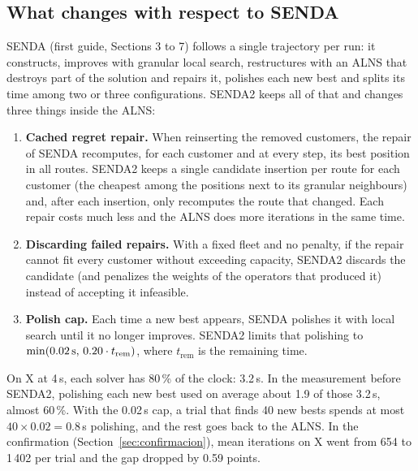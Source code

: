 \documentclass[11pt,a4paper]{article}
\newcommand{\senda}{SENDA}
\newcommand{\sendados}{SENDA2}
\begin{document}
\subsection{What changes with respect to \senda}

\senda{} (first guide, Sections 3 to 7) follows a single trajectory per run: it constructs, improves
with granular local search, restructures with an ALNS that destroys part of the solution and repairs
it, polishes each new best and splits its time among two or three configurations. \sendados{} keeps all
of that and changes three things inside the ALNS:

\begin{enumerate}[leftmargin=1.5em,label=(\alph*)]
\item \textbf{Cached regret repair.} When reinserting the removed customers, the repair of \senda{}
recomputes, for each customer and at every step, its best position in all routes. \sendados{} keeps a
single candidate insertion per route for each customer (the cheapest among the positions next to its
granular neighbours) and, after each insertion, only recomputes the route that changed. Each repair
costs much less and the ALNS does more iterations in the same time.
\item \textbf{Discarding failed repairs.} With a fixed fleet and no penalty, if the repair cannot fit
every customer without exceeding capacity, \sendados{} discards the candidate (and penalizes the
weights of the operators that produced it) instead of accepting it infeasible.
\item \textbf{Polish cap.} Each time a new best appears, \senda{} polishes it with local search until
it no longer improves. \sendados{} limits that polishing to $\min(0.02\text{\,s},\,0.20\cdot t_{\text{rem}})$,
where $t_{\text{rem}}$ is the remaining time.
\end{enumerate}

\begin{ejemplo}
On X at 4\,s, each solver has 80\,\% of the clock: 3.2\,s. In the measurement before \sendados, polishing
each new best used on average about 1.9 of those 3.2\,s, almost 60\,\%. With the 0.02\,s cap, a trial that
finds 40 new bests spends at most $40 \times 0.02 = 0.8$\,s polishing, and the rest goes back to the
ALNS. In the confirmation (Section~\ref{sec:confirmacion}), mean iterations on X went from 654 to
1\,402 per trial and the gap dropped by 0.59 points.
\end{ejemplo}
\end{document}
